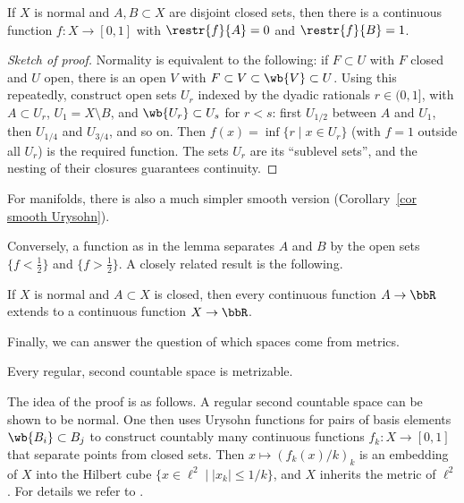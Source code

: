 \begin{thm}\label{thm Urysohn lemma}
    If $X$ is normal and $A,B\subset X$ are disjoint closed sets, then there is a continuous function $f:X\to[0,1]$ with $\restr{f}{A}=0$ and $\restr{f}{B}=1$.
\end{thm}
\begin{proof}[Sketch of proof]
    Normality is equivalent to the following: if $F\subset U$ with $F$ closed and $U$ open, there is an open $V$ with $F\subset V\subset\wb{V}\subset U$. Using this repeatedly, construct open sets $U_r$ indexed by the dyadic rationals $r\in(0,1]$, with $A\subset U_r$, $U_1=X\setminus B$, and $\wb{U_r}\subset U_s$ for $r<s$: first $U_{1/2}$ between $A$ and $U_1$, then $U_{1/4}$ and $U_{3/4}$, and so on. Then $f(x)=\inf\{r\mid x\in U_r\}$ (with $f=1$ outside all $U_r$) is the required function. The sets $U_r$ are its ``sublevel sets'', and the nesting of their closures guarantees continuity.
\end{proof}
For manifolds, there is also a much simpler smooth version (Corollary~\ref{cor smooth Urysohn}).

Conversely, a function as in the lemma separates $A$ and $B$ by the open sets $\{f<\frac12\}$ and $\{f>\frac12\}$. A closely related result is the following.

\begin{thm}
    If $X$ is normal and $A\subset X$ is closed, then every continuous function $A\to\bbR$ extends to a continuous function $X\to\bbR$.
\end{thm}

Finally, we can answer the question of which spaces come from metrics.

\begin{thm}
    Every regular, second countable space is metrizable.
\end{thm}

The idea of the proof is as follows. A regular second countable space can be shown to be normal. One then uses Urysohn functions for pairs of basis elements $\wb{B_i}\subset B_j$ to construct countably many continuous functions $f_k:X\to[0,1]$ that separate points from closed sets. Then $x\mapsto(f_k(x)/k)_k$ is an embedding of $X$ into the Hilbert cube $\{x\in\ell^2\mid\lvert x_k\rvert\leq1/k\}$, and $X$ inherits the metric of $\ell^2$. For details we refer to \cite{Munk}.

